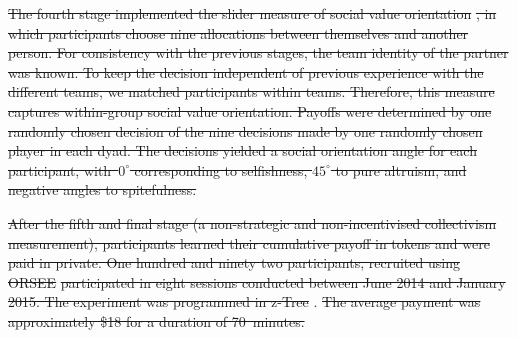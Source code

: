 \documentclass[12pt,a4paper]{article}
\makeatletter
\renewcommand\section{\@startsection {section}{1}{\z@}%
{-3.5ex \@plus -1ex \@minus -.2ex}%
{2.3ex \@plus.2ex}%
{\bf\sffamily\Large}}
\providecommand{\DIFaddtex}[1]{{\protect\color{blue}\uwave{#1}}} %
\providecommand{\DIFdeltex}[1]{{\protect\color{red}\sout{#1}}}                      %
\providecommand{\DIFaddbegin}{} %
\providecommand{\DIFaddend}{} %
\providecommand{\DIFdelbegin}{} %
\providecommand{\DIFdelend}{} %
\providecommand{\DIFadd}[1]{\texorpdfstring{\DIFaddtex{#1}}{#1}} %
\providecommand{\DIFdel}[1]{\texorpdfstring{\DIFdeltex{#1}}{}} %
\makeatother
\begin{document}
\DIFdel{The fourth stage implemented the slider measure of social value orientation
}%
\DIFdel{, in which participants
choose nine allocations between themselves and another person.
For
consistency with the previous stages, the team identity of the partner
was known. To keep the decision independent of previous experience
with the different teams, we matched participants within teams. Therefore, this measure captures within-group social value orientation. Payoffs
were determined by one randomly chosen decision of the nine decisions
made by one randomly chosen player in each dyad. The decisions yielded
a social orientation angle for each participant, with~$0^{\circ}$
corresponding to selfishness, $45^{\circ}$ to pure altruism, and
negative angles to spitefulness.
}%

\DIFdel{After the fifth and final stage (a non-strategic and non-incentivised
collectivism measurement), participants learned their cumulative payoff in tokens and were paid in private.
One hundred and ninety two participants, recruited using ORSEE }%
\DIFdel{participated in eight sessions conducted between June 2014 and January
2015. %
The experiment was programmed in z-Tree
}%
\DIFdelend \DIFaddbegin \DIFadd{13)}\DIFaddend .
\DIFdelbegin \DIFdel{The average payment was approximately \$18 for a duration of 70~minutes.
}\DIFdelend 


\newpage
\printbibliography
%
%

\newpage

\DIFdelbegin %
\end{document}

